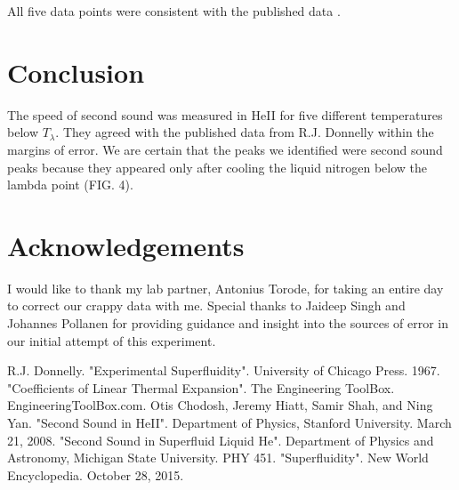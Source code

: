 \documentclass[prb,aps,twocolumn,showpacs,10pt]{revtex4-1}
\begin{document}
All five data points were consistent with the published data \cite{blah}.


\section{Conclusion}
The speed of second sound was measured in HeII for five different temperatures below $T_\lambda$. They agreed with the published data from R.J. Donnelly within the margins of error. We are certain that the peaks we identified were second sound peaks because they appeared only after cooling the liquid nitrogen below the lambda point (FIG. 4). \\





\section{Acknowledgements}
I would like to thank my lab partner, Antonius Torode, for taking an entire day to correct our crappy data with me. Special thanks to Jaideep Singh and Johannes Pollanen for providing guidance and insight into the sources of error in our initial attempt of this experiment. 



\newpage
\begin{references}
 R.J. Donnelly. "Experimental Superfluidity". University of Chicago Press. 1967. 
 "Coefficients of Linear Thermal Expansion". The Engineering ToolBox. EngineeringToolBox.com. 
 Otis Chodosh, Jeremy Hiatt, Samir Shah, and Ning Yan. "Second Sound in HeII". Department of Physics, Stanford University. March 21, 2008.
 "Second Sound in Superfluid Liquid He". Department of Physics and Astronomy, Michigan State University. PHY 451.
 "Superfluidity". New World Encyclopedia. October 28, 2015. 
\end{references}
\end{document}
